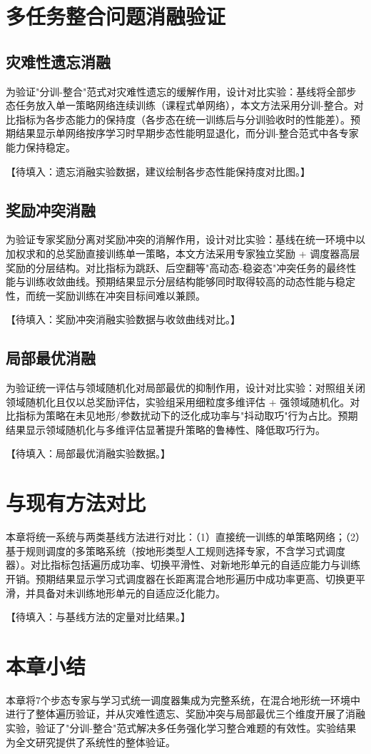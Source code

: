 \section{多任务整合问题消融验证}

\subsection{灾难性遗忘消融}

为验证"分训-整合"范式对灾难性遗忘的缓解作用，设计对比实验：基线将全部步态任务放入单一策略网络连续训练（课程式单网络），本文方法采用分训-整合。对比指标为各步态能力的保持度（各步态在统一训练后与分训验收时的性能差）。预期结果显示单网络按序学习时早期步态性能明显退化，而分训-整合范式中各专家能力保持稳定。

【待填入：遗忘消融实验数据，建议绘制各步态性能保持度对比图。】

\subsection{奖励冲突消融}

为验证专家奖励分离对奖励冲突的消解作用，设计对比实验：基线在统一环境中以加权求和的总奖励直接训练单一策略，本文方法采用专家独立奖励 + 调度器高层奖励的分层结构。对比指标为跳跃、后空翻等"高动态-稳姿态"冲突任务的最终性能与训练收敛曲线。预期结果显示分层结构能够同时取得较高的动态性能与稳定性，而统一奖励训练在冲突目标间难以兼顾。

【待填入：奖励冲突消融实验数据与收敛曲线对比。】

\subsection{局部最优消融}

为验证统一评估与领域随机化对局部最优的抑制作用，设计对比实验：对照组关闭领域随机化且仅以总奖励评估，实验组采用细粒度多维评估 + 强领域随机化。对比指标为策略在未见地形/参数扰动下的泛化成功率与"抖动取巧"行为占比。预期结果显示领域随机化与多维评估显著提升策略的鲁棒性、降低取巧行为。

【待填入：局部最优消融实验数据。】

\section{与现有方法对比}

本章将统一系统与两类基线方法进行对比：（1）直接统一训练的单策略网络；（2）基于规则调度的多策略系统（按地形类型人工规则选择专家，不含学习式调度器）。对比指标包括遍历成功率、切换平滑性、对新地形单元的自适应能力与训练开销。预期结果显示学习式调度器在长距离混合地形遍历中成功率更高、切换更平滑，并具备对未训练地形单元的自适应泛化能力。

【待填入：与基线方法的定量对比结果。】

\section{本章小结}

本章将7个步态专家与学习式统一调度器集成为完整系统，在混合地形统一环境中进行了整体遍历验证，并从灾难性遗忘、奖励冲突与局部最优三个维度开展了消融实验，验证了"分训-整合"范式解决多任务强化学习整合难题的有效性。实验结果为全文研究提供了系统性的整体验证。

